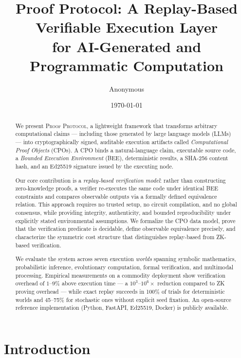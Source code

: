 \documentclass[11pt]{article}
\title{\textbf{Proof Protocol: A Replay-Based Verifiable Execution Layer\\
for AI-Generated and Programmatic Computation}}
\author[1]{Anonymous}
\affil[1]{Preprint — submitted to arXiv cs.CR / cs.DC}
\date{\today}
\begin{document}
\maketitle

\begin{abstract}
We present \textsc{Proof Protocol}, a lightweight framework that transforms
arbitrary computational claims — including those generated by large language
models (LLMs) — into cryptographically signed, auditable execution artifacts
called \emph{Computational Proof Objects} (CPOs).  A CPO binds a
natural-language claim, executable source code, a \emph{Bounded Execution
Environment} (BEE), deterministic results, a SHA-256 content hash, and an
Ed25519 signature issued by the executing node.

Our core contribution is a \emph{replay-based verification model}: rather
than constructing zero-knowledge proofs, a verifier re-executes the same
code under identical BEE constraints and compares observable outputs via a
formally defined equivalence relation.  This approach requires no trusted
setup, no circuit compilation, and no global consensus, while providing
integrity, authenticity, and bounded reproducibility under explicitly stated
environmental assumptions.  We formalize the CPO data model, prove that the
verification predicate is decidable, define observable equivalence precisely,
and characterize the symmetric cost structure that distinguishes
replay-based from ZK-based verification.

We evaluate the system across seven execution \emph{worlds} spanning
symbolic mathematics, probabilistic inference, evolutionary computation,
formal verification, and multimodal processing.  Empirical measurements on
a commodity deployment show verification overhead of $1$--$9\%$ above
execution time — a $10^3$--$10^6\times$ reduction compared to ZK proving
overhead — while exact replay succeeds in 100\% of trials for deterministic
worlds and 45--75\% for stochastic ones without explicit seed fixation.
An open-source reference implementation (Python, FastAPI, Ed25519, Docker)
is publicly available.
\end{abstract}

\tableofcontents
\newpage

\section{Introduction}
\label{sec:intro}
\end{document}
